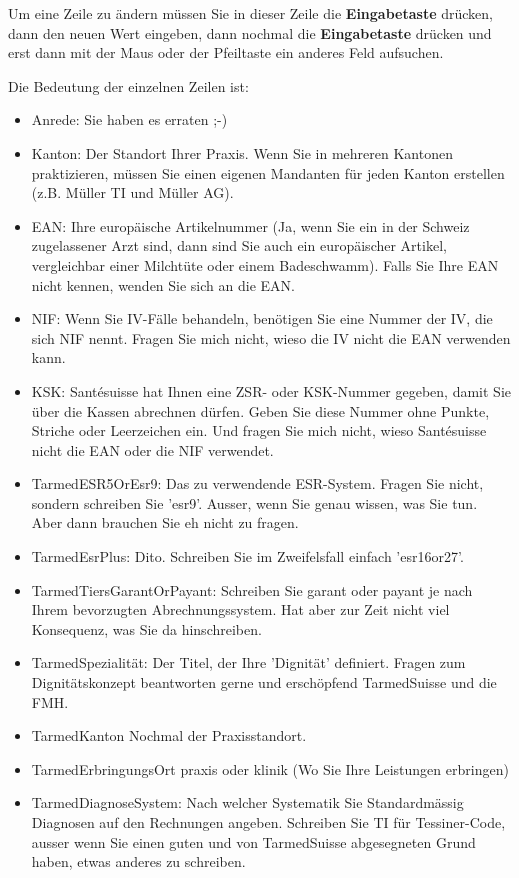 \documentclass[a4paper]{scrartcl}
\begin{document}
Um eine Zeile zu ändern müssen Sie in dieser Zeile die \textbf{Eingabetaste} drücken, dann den neuen Wert eingeben, dann nochmal die \textbf{Eingabetaste} drücken und erst dann mit der Maus oder der Pfeiltaste ein anderes Feld aufsuchen.

Die Bedeutung der einzelnen Zeilen ist:
\begin{itemize}
\item Anrede: Sie haben es erraten ;-)
\item Kanton: Der Standort Ihrer Praxis. Wenn Sie in mehreren Kantonen praktizieren, müssen Sie einen eigenen Mandanten für jeden Kanton erstellen (z.B. Müller TI und Müller AG).
\item EAN: Ihre europäische Artikelnummer (Ja, wenn Sie ein in der Schweiz zugelassener Arzt sind, dann sind Sie auch ein europäischer Artikel, vergleichbar einer Milchtüte oder einem Badeschwamm). Falls Sie Ihre EAN nicht kennen, wenden Sie sich an die EAN.
\item NIF: Wenn Sie IV-Fälle behandeln, benötigen Sie eine Nummer der IV, die sich NIF nennt. Fragen Sie mich nicht, wieso die IV nicht die EAN verwenden kann.
\item KSK: Santésuisse hat Ihnen eine ZSR- oder KSK-Nummer gegeben, damit Sie über die Kassen abrechnen dürfen. Geben Sie diese Nummer ohne Punkte, Striche oder Leerzeichen ein. Und fragen Sie mich nicht, wieso Santésuisse nicht die EAN oder die NIF verwendet.
\item TarmedESR5OrEsr9: Das zu verwendende ESR-System. Fragen Sie  nicht, sondern schreiben Sie 'esr9'. Ausser, wenn Sie genau wissen, was Sie tun. Aber dann brauchen Sie eh nicht zu fragen.
\item TarmedEsrPlus: Dito. Schreiben Sie im Zweifelsfall einfach 'esr16or27'.
\item TarmedTiersGarantOrPayant: Schreiben Sie garant oder payant je nach Ihrem bevorzugten Abrechnungssystem. Hat aber zur Zeit nicht viel Konsequenz, was Sie da hinschreiben.
\item TarmedSpezialität: Der Titel, der Ihre 'Dignität' definiert. Fragen zum  Dignitätskonzept beantworten gerne und erschöpfend TarmedSuisse und die FMH.
\item TarmedKanton Nochmal der Praxisstandort.
\item TarmedErbringungsOrt praxis oder klinik (Wo Sie Ihre Leistungen erbringen)
\item TarmedDiagnoseSystem: Nach welcher Systematik Sie Standardmässig Diagnosen auf den Rechnungen angeben. Schreiben Sie TI für Tessiner-Code, ausser wenn Sie einen guten und von TarmedSuisse abgesegneten Grund haben, etwas anderes zu schreiben.
\end{itemize}
\end{document}
